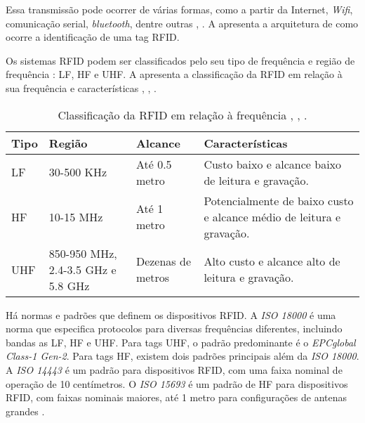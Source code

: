 Essa transmissão pode ocorrer de várias formas, como a partir da Internet, \textit{Wifi}, comunicação serial, \textit{bluetooth}, dentre outras \cite{Li2016}, \cite{Chen2017EfficientTags}. A  apresenta a arquitetura de como ocorre a identificação de uma tag \acrshort{RFID}.


\newpage

Os sistemas \acrshort{RFID} podem ser classificados pelo seu tipo de frequência e região de frequência \cite{Chieochan2017}: \acrfull{LF}, \acrfull{HF} e \acrfull{UHF}. A  apresenta a classificação da \acrshort{RFID} em relação à sua frequência e características \cite{Bolic2010}, \cite{Juels2006RFIDSurvey}, \cite{Li2016}.

\begin{table}[htb!]
\caption{Classificação da \acrshort{RFID} em relação à frequência \cite{Bolic2010}, \cite{Juels2006RFIDSurvey}, \cite{Li2016}.}
\label{tab:classificacao-rfid}
\begin{tabular}
{|p{3.0cm}|p{5cm}|p{2.5cm}|p{3.7cm}|}
\hline 
\textbf{Tipo} & \textbf{Região} & \textbf{Alcance} & \textbf{Características} \\ \hline
\acrfull{LF} & 30-500 \acrfull{KHz} & Até 0.5 metro & Custo baixo e alcance baixo de leitura e gravação. \\ \hline
\acrfull{HF} & 10-15 \acrfull{MHz} & Até 1 metro & Potencialmente de baixo custo e alcance médio de leitura e gravação. \\ \hline
\acrfull{UHF} & 850-950 \acrfull{MHz}, 2.4-3.5 \acrfull{GHz} e 5.8 \acrfull{GHz} & Dezenas de metros & Alto custo e alcance alto de leitura e gravação. \\ \hline
\end{tabular}
\end{table}

Há normas e padrões que definem os dispositivos \acrshort{RFID}. A \textit{ISO 18000} é uma norma que especifica protocolos para diversas frequências diferentes, incluindo bandas as \acrshort{LF}, \acrshort{HF} e \acrshort{UHF}. Para tags \acrshort{UHF}, o padrão predominante é o \textit{EPCglobal Class-1 Gen-2}. Para tags \acrshort{HF}, existem dois padrões principais além da \textit{ISO 18000}. A \textit{ISO 14443} é um padrão para dispositivos \acrshort{RFID}, com uma faixa nominal de operação de 10 centímetros. O \textit{ISO 15693} é um padrão de \acrshort{HF} para dispositivos RFID, com faixas nominais maiores, até 1 metro para configurações de antenas grandes \cite{Juels2006RFIDSurvey}.

